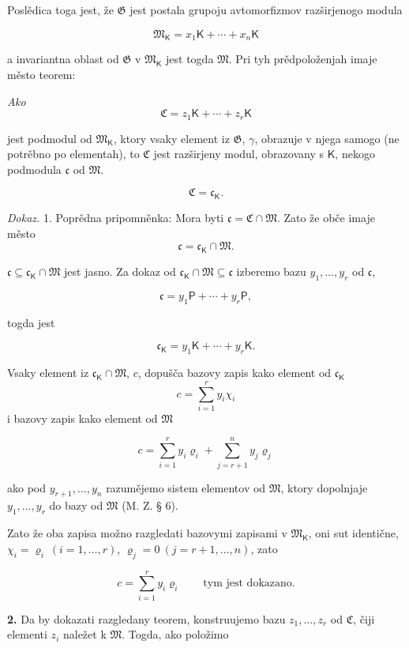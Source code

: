 \documentclass[11pt]{article}
\begin{document}
Poslědica toga jest, že \(\mathfrak G\) jest postala grupoju avtomorfizmov razširjenogo modula

\[
\mathfrak M_{\mathsf K}=x_1\mathsf K+\cdots+x_n\mathsf K
\]

a invariantna oblast od \(\mathfrak G\) v \(\mathfrak M_{\mathsf K}\) jest togda \(\mathfrak M\). Pri tyh prědpoloženjah imaje město teorem:

\begingroup\itshape
Ako
\[
\mathfrak C=z_1\mathsf K+\cdots+z_r\mathsf K
\]

jest podmodul od \(\mathfrak M_{\mathsf K}\), ktory vsaky element iz \(\mathfrak G\), \(\gamma\), obrazuje v njega samogo (ne potrěbno po elementah), to \(\mathfrak C\) jest razširjeny modul, obrazovany s \(\mathsf K\), nekogo podmodula \(\mathfrak c\) od \(\mathfrak M\).

\[
\mathfrak C=\mathfrak c_{\mathsf K}.
\]
\endgroup

\emph{Dokaz.} 1. Poprědna pripomněnka: Mora byti \(\mathfrak c=\mathfrak C\cap\mathfrak M\). Zato že obče imaje město
\[
\mathfrak c=\mathfrak c_{\mathsf K}\cap\mathfrak M.
\]

\(\mathfrak c\subseteq\mathfrak c_{\mathsf K}\cap\mathfrak M\) jest jasno. Za dokaz od \(\mathfrak c_{\mathsf K}\cap\mathfrak M\subseteq\mathfrak c\) izberemo bazu \(y_1,\ldots,y_r\) od \(\mathfrak c\),

\[
\mathfrak c=y_1\mathsf P+\cdots+y_r\mathsf P,
\]

togda jest

\[
\mathfrak c_{\mathsf K}=y_1\mathsf K+\cdots+y_r\mathsf K.
\]

Vsaky element iz \(\mathfrak c_{\mathsf K}\cap\mathfrak M\), \(c\), dopušča bazovy zapis kako element od \(\mathfrak c_{\mathsf K}\)
\[
c=\sum_{i=1}^{r}y_i\chi_i
\]
i bazovy zapis kako element od \(\mathfrak M\)

\[
c=\sum_{i=1}^{r}y_i\varrho_i+\sum_{j=r+1}^{n}y_j\varrho_j
\]

ako pod \(y_{r+1},\ldots,y_n\) razumějemo sistem elementov od \(\mathfrak M\), ktory dopolnjaje \(y_1,\ldots,y_r\) do bazy od \(\mathfrak M\) (M. Z. § 6).

Zato že oba zapisa možno razgledati bazovymi zapisami v \(\mathfrak M_{\mathsf K}\), oni sut identične, \(\chi_i=\varrho_i\ (i=1,\ldots,r)\), \(\varrho_j=0\ (j=r+1,\ldots,n)\), zato

\[
c=\sum_{i=1}^{r}y_i\varrho_i
\qquad\text{tym jest dokazano.}
\]

\textbf{2.} Da by dokazati razgledany teorem, konstruujemo bazu \(z_1,\ldots,z_r\) od \(\mathfrak C\), čiji elementi \(z_i\) naležet k \(\mathfrak M\). Togda, ako položimo
\end{document}
